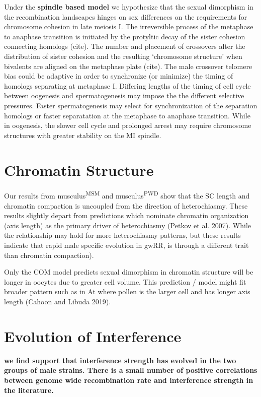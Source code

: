 \documentclass[]{article}
\begin{document}
Under the \textbf{spindle based model} we hypothesize that the sexual
dimorphism in the recombination landscapes hinges on sex differences on
the requirements for chromosome cohesion in late meiosis I. The
irreversible process of the metaphase to anaphase transition is
initiated by the protyltic decay of the sister cohesion connecting
homologs (cite). The number and placement of crossovers alter the
distribution of sister cohesion and the resulting `chromosome structure'
when bivalents are aligned on the metaphase plate (cite). The male
crossover telomere bias could be adaptive in order to synchronize (or
minimize) the timing of homologs separating at metaphase I. Differing
lengths of the timing of cell cycle between oogenesis and
spermatogenesis may impose the the different selective pressures. Faster
spermatogenesis may select for synchronization of the separation
homologs or faster separatation at the metaphase to anaphase transition.
While in oogenesis, the slower cell cycle and prolonged arrest may
require chromosome structures with greater stability on the MI spindle.

\section{Chromatin Structure}\label{chromatin-structure}

Our results from musculus\textsuperscript{MSM} and
musculus\textsuperscript{PWD} show that the SC length and chromatin
compaction is uncoupled from the direction of heterochiasmy. These
results slightly depart from predictions which nominate chromatin
organization (axis length) as the primary driver of heterochiasmy
(Petkov et al. 2007). While the relationship may hold for more
heterochiasmy patterns, but these results indicate that rapid male
specific evolution in gwRR, is through a different trait than chromatin
compaction).

Only the COM model predicts sexual dimorphism in chromatin structure
will be longer in oocytes due to greater cell volume. This prediction /
model might fit broader pattern such as in At where pollen is the larger
cell and has longer axis length (Cahoon and Libuda 2019).

\section{Evolution of Interference}\label{evolution-of-interference}

\textbf{we find support that interference strength has evolved in the
two groups of male strains. There is a small number of positive
correlations between genome wide recombination rate and interference
strength in the literature.}
\end{document}
